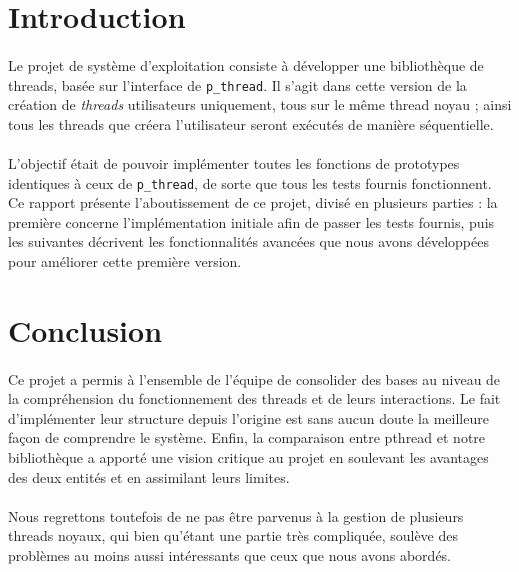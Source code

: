 \documentclass[a4paper]{article}
\begin{document}


\newpage


\section*{Introduction}

\paragraph{}
Le projet de système d'exploitation consiste à développer une bibliothèque de threads, basée sur l'interface de \texttt{p\_thread}. Il s'agit dans cette version de la création de \emph{threads} utilisateurs uniquement, tous sur le même thread noyau ; ainsi tous les threads que créera l'utilisateur seront exécutés de manière séquentielle.

\paragraph{}
L'objectif était de pouvoir implémenter toutes les fonctions de prototypes identiques à ceux de \texttt{p\_thread}, de sorte que tous les tests fournis fonctionnent. Ce rapport présente l'aboutissement de ce projet, divisé en plusieurs parties : la première concerne l'implémentation initiale afin de passer les tests fournis, puis les suivantes décrivent les fonctionnalités avancées que nous avons développées pour améliorer cette première version.

\newpage














\section*{Conclusion}
\paragraph{}
Ce projet a permis à l'ensemble de l'équipe de consolider des bases au niveau de la compréhension du fonctionnement des threads et de leurs interactions. Le fait d'implémenter leur structure depuis l'origine est sans aucun doute la meilleure façon de comprendre le système. Enfin, la comparaison entre pthread et notre bibliothèque a apporté une vision critique au projet en soulevant les avantages des deux entités et en assimilant leurs limites.  
\paragraph{}
Nous regrettons toutefois de ne pas être parvenus à la gestion de plusieurs threads noyaux, qui bien qu'étant une partie très compliquée, soulève des problèmes au moins aussi intéressants que ceux que nous avons abordés.
\end{document}
